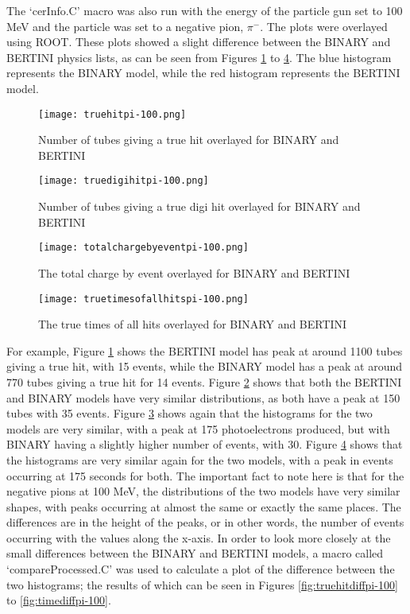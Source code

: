 \documentclass[11pt,oneside,a4paper]{article}
\begin{document}
The `cerInfo.C' macro was also run with the energy of the particle gun set to 100 MeV and the particle was set to a negative pion, $\pi^-$. The plots were overlayed using ROOT. These plots showed a slight difference between the BINARY and BERTINI physics lists, as can be seen from Figures \ref{fig:truehitpi-100} to \ref{fig:timepi-100}. The blue histogram represents the BINARY model, while the red histogram represents the BERTINI model.

\begin{figure}
	\centering
	\texttt{[image: truehitpi-100.png]}
	\caption{Number of tubes giving a true hit overlayed for BINARY and BERTINI}
	\label{fig:truehitpi-100}
\end{figure}

\begin{figure}
	\centering
	\texttt{[image: truedigihitpi-100.png]}
	\caption{Number of tubes giving a true digi hit overlayed for BINARY and BERTINI}
	\label{fig:truedigihitpi-100}
\end{figure}

\begin{figure}
	\centering
	\texttt{[image: totalchargebyeventpi-100.png]}
	\caption{The total charge by event overlayed for BINARY and BERTINI}
	\label{fig:qpi-100}
\end{figure}


\begin{figure}
	\centering
	\texttt{[image: truetimesofallhitspi-100.png]}
	\caption{The true times of all hits overlayed for BINARY and BERTINI}
	\label{fig:timepi-100}
\end{figure}

For example, Figure \ref{fig:truehitpi-100} shows the BERTINI model has peak at around 1100 tubes giving a true hit, with 15 events, while the BINARY model has a peak at around 770 tubes giving a true hit for 14 events. Figure \ref{fig:truedigihitpi-100} shows that both the BERTINI and BINARY models have very similar distributions, as both have a peak at 150 tubes with 35 events. Figure \ref{fig:qpi-100} shows again that the histograms for the two models are very similar, with a peak at 175 photoelectrons produced, but with BINARY having a slightly higher number of events, with 30. Figure \ref{fig:timepi-100} shows that the histograms are very similar again for the two models, with a peak in events occurring at 175 seconds for both. The important fact to note here is that for the negative pions at 100 MeV, the distributions of the two models have very similar shapes, with peaks occurring at almost the same or exactly the same places. The differences are in the height of the peaks, or in other words, the number of events occurring with the values along the x-axis. In order to look more closely at the small differences between the BINARY and BERTINI models, a macro called `compareProcessed.C' was used to calculate a plot of the difference between the two histograms; the results of which can be seen in Figures \ref{fig:truehitdiffpi-100} to \ref{fig:timediffpi-100}.
\end{document}
